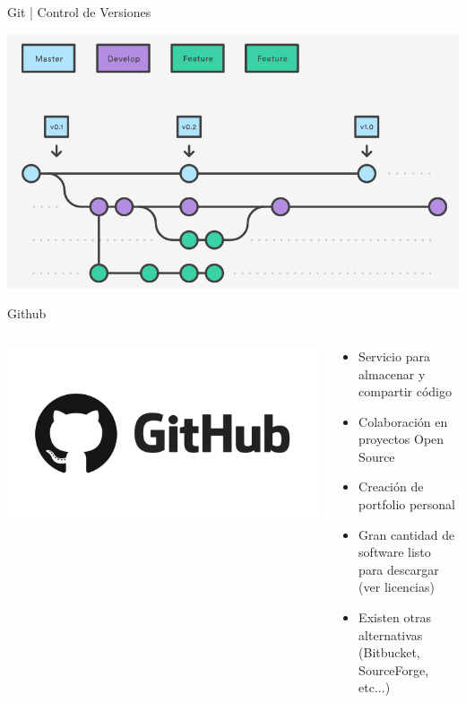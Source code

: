 \documentclass{beamer}
\begin{document}
\begin{frame}{Git | Control de Versiones}
	
	\includegraphics[scale=.35]{img/git_project.png}
	
\end{frame}

\begin{frame}{Github}
	\begin{columns}
		\begin{column}{.4\textwidth}
			\includegraphics[scale=.1]{img/github.jpeg}
		\end{column}
		\begin{column}{.75\textwidth}
			
			\begin{itemize}
				\item Servicio para almacenar y compartir código 
				\vspace{0.25cm}
				\item Colaboración en proyectos Open Source
				\vspace{0.25cm}
				\item Creación de portfolio personal
				\vspace{0.25cm}
				\item Gran cantidad de software listo para descargar (ver licencias)
				\vspace{0.25cm}
				\item Existen otras alternativas (Bitbucket, SourceForge, etc...)
			\end{itemize}
		\end{column}
	\end{columns}
	
\end{frame}
\end{document}
